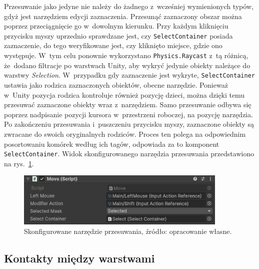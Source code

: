 Przesuwanie jako jedyne nie należy do żadnego z~wcześniej wymienionych typów,
gdyż jest narzędziem edycji zaznaczenia.
Przesunąć zaznaczony obszar można poprzez przeciągnięcie go w~dowolnym kierunku.
Przy każdym kliknięciu przycisku myszy uprzednio sprawdzane jest,
czy \texttt{SelectContainer} posiada zaznaczenie,
do tego weryfikowane jest, czy kliknięto miejsce, gdzie ono występuje.
W~tym celu ponownie wykorzystano \texttt{Physics.Raycast} z~tą różnicą,
że~dodano filtracje po warstwach Unity, aby wykryć jedynie obiekty należące do warstwy \textit{Selection}.
W~przypadku gdy zaznaczenie jest wykryte, \texttt{SelectContainer} ustawia jako rodzica zaznaczonych obiektów,
obecne narzędzie.
Ponieważ w~Unity pozycja rodzica kontroluje również pozycję dzieci,
można dzięki temu przesuwać zaznaczone obiekty wraz z~narzędziem.
Samo przesuwanie odbywa się poprzez nadpisanie pozycji kursora w~przestrzeni roboczej, na pozycję narzędzia.
%
Po zakończeniu przesuwania i~puszczeniu przycisku myszy,
zaznaczone obiekty są zwracane do swoich oryginalnych rodziców.
Proces ten polega na odpowiednim posortowaniu komórek według ich tagów, 
odpowiada za to komponent \texttt{SelectContainer}.
Widok skonfigurowanego narzędzia przesuwania przedstawiono na rys.~\ref{fig:move}.

\begin{figure}[h!]
    \centering
    \includegraphics[width=0.9\textwidth]{chapters/chapter4/rys/tools/move}
    \caption[Skonfigurowane narzędzie przesuwania.]{Skonfigurowane narzędzie przesuwania, źródło: opracowanie własne.}
    \label{fig:move}
\end{figure}

\subsection{Kontakty między warstwami}
\label{subsec:kontakty}

